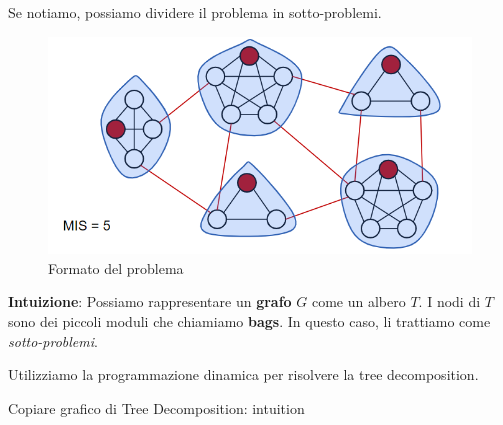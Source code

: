 Se notiamo, possiamo dividere il problema in sotto-problemi.

\begin{figure}
    \begin{center}
        \includegraphics[scale=0.5]{chapters/images/clique format.png}
    \end{center}
    \caption{Formato del problema}
\end{figure}

\textbf{Intuizione}: Possiamo rappresentare un \textbf{grafo} $G$ come un albero $T$. I nodi di $T$ sono dei piccoli
moduli che chiamiamo \textbf{bags}. In questo caso, li trattiamo come \textit{sotto-problemi}.

Utilizziamo la programmazione dinamica per risolvere la tree decomposition.

Copiare grafico di Tree Decomposition: intuition

